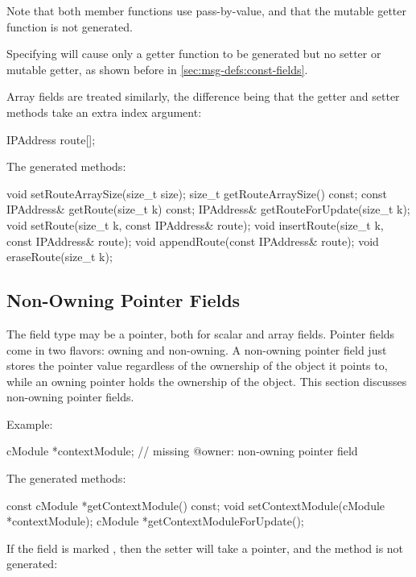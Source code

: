 Note that both member functions use pass-by-value, and that the mutable getter
function is not generated.

Specifying  will cause only a getter function to be generated
but no setter or mutable getter, as shown before in \ref{sec:msg-defs:const-fields}.

Array fields are treated similarly, the difference being that the getter and setter
methods take an extra index argument:

\begin{msg}
IPAddress route[];
\end{msg}

The generated methods:

\begin{cpp}
void setRouteArraySize(size_t size);
size_t getRouteArraySize() const;
const IPAddress& getRoute(size_t k) const;
IPAddress& getRouteForUpdate(size_t k);
void setRoute(size_t k, const IPAddress& route);
void insertRoute(size_t k, const IPAddress& route);
void appendRoute(const IPAddress& route);
void eraseRoute(size_t k);
\end{cpp}


\subsection{Non-Owning Pointer Fields}
\label{sec:msg-defs:pointers-fields}

The field type may be a pointer, both for scalar and array fields. Pointer
fields come in two flavors: owning and non-owning. A non-owning pointer field
just stores the pointer value regardless of the ownership of the object it
points to, while an owning pointer holds the ownership of the object. This
section discusses non-owning pointer fields.

Example:

\begin{msg}
cModule *contextModule;  // missing @owner: non-owning pointer field
\end{msg}

The generated methods:

\begin{cpp}
const cModule *getContextModule() const;
void setContextModule(cModule *contextModule);
cModule *getContextModuleForUpdate();
\end{cpp}

If the field is marked , then the setter will take a
 pointer, and the  method is not generated:

